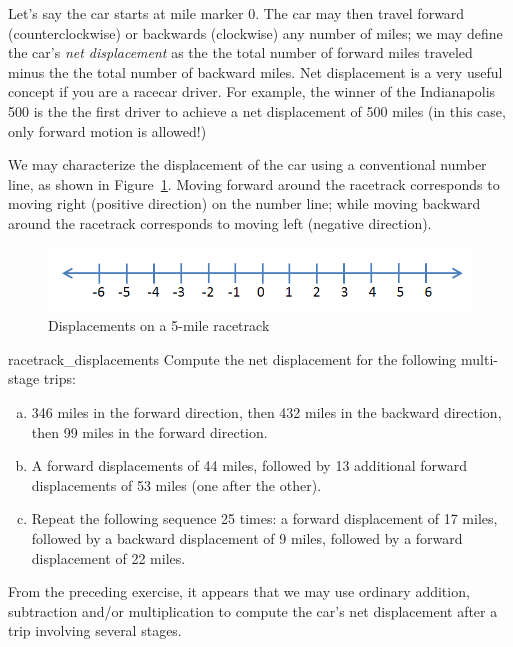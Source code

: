 Let's say the car starts at mile marker 0. The car may then travel forward (counterclockwise) or backwards (clockwise) any number of miles; we may define the car's  \emph{net displacement} as the the total number of forward miles traveled minus the the total number of backward miles. Net displacement is a very useful concept if you are a racecar driver. For example, the winner of the Indianapolis 500 is the the first driver to achieve a net displacement of 500 miles (in this case, only forward motion is allowed!)

We may characterize the displacement of the car using  
a conventional number line, as shown in Figure~\ref{fig:displacement}. Moving forward around the racetrack corresponds to moving right (positive direction) on the number line; while moving backward around the racetrack corresponds to moving left (negative direction).
\begin{figure}[h]\label{fig:displacement}
\begin{center}
\includegraphics[width=4.5in]{images/integer_line.png}
\end{center}
\caption{Displacements on a 5-mile racetrack}
\end{figure}

\begin{exercise}{racetrack_displacements}
Compute the net displacement for the following multi-stage trips:
\begin{enumerate}[(a)]
\item
346 miles in the forward direction, then 432 miles in the backward direction, then 99 miles in the forward direction.
\item A forward displacements of 44 miles, followed by 13 additional forward displacements of 53 miles (one after the other).
\item Repeat the following sequence 25 times: a forward displacement  of 17 miles, followed by a backward displacement of 9 miles, followed by a forward displacement of 22 miles.
\end{enumerate}
\end{exercise}
From the preceding exercise, it appears that we may use ordinary addition, subtraction and/or multiplication to compute the car's net displacement after a trip involving several stages.

